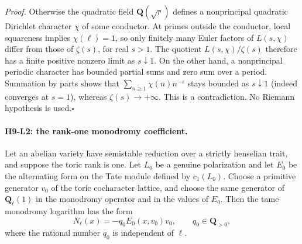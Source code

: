 \emph{Proof.} Otherwise the quadratic field $\mathbf Q(\sqrt r)$
defines a nonprincipal quadratic Dirichlet character $\chi$ of some
conductor. At primes outside the conductor, local squareness implies
$\chi(\ell)=1$, so only finitely many Euler factors of $L(s,\chi)$
differ from those of $\zeta(s)$, for real $s>1$. The quotient
$L(s,\chi)/\zeta(s)$ therefore has a finite positive nonzero limit as
$s\downarrow1$. On the other hand, a nonprincipal periodic character
has bounded partial sums and zero sum over a period. Summation by parts
shows that $\sum_{n\ge1}\chi(n)n^{-s}$ stays bounded as $s\downarrow1$
(indeed converges at $s=1$), whereas $\zeta(s)\to+\infty$.
This is a contradiction. No Riemann hypothesis is used.\hfill$\square$

\paragraph{H9-L2: the rank-one monodromy coefficient.}
Let an abelian variety have semistable reduction over a strictly
henselian trait, and suppose the toric rank is one. Let $L_0$ be a
genuine polarization and let $E_0$ be the alternating form on the Tate
module defined by $c_1(L_0)$. Choose a primitive generator $v_0$ of the
toric cocharacter lattice, and choose the same generator of
$\mathbf Q_\ell(1)$ in the monodromy operator and in the values of $E_0$.
Then the tame monodromy logarithm has the form
\[
 N_\ell(x)=-q_0 E_0(x,v_0)v_0,\qquad q_0\in\mathbf Q_{>0},
                                                        \tag{H9.12}
\]
where the rational number $q_0$ is independent of $\ell$.

